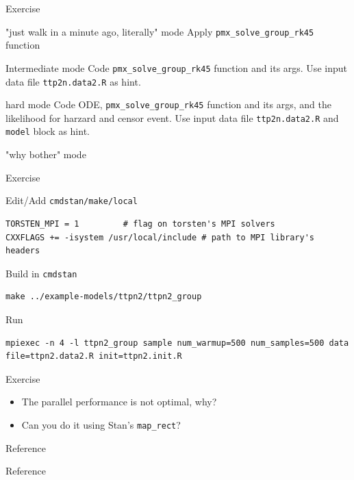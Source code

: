 \documentclass[presentation]{beamer}
\begin{document}
\begin{frame}[fragile,label={sec:org2eb4042}]{Exercise}
 \begin{block}{"just walk in a minute ago, literally" mode}
Apply \texttt{pmx\_solve\_group\_rk45} function
\end{block}
\begin{block}{Intermediate mode}
Code \texttt{pmx\_solve\_group\_rk45} function and its args. Use input data file \texttt{ttp2n.data2.R} as hint.
\end{block}
\begin{block}{hard mode}
Code ODE, \texttt{pmx\_solve\_group\_rk45} function and its args,
and the likelihood for harzard and censor event. Use input
data file \texttt{ttp2n.data2.R} and \texttt{model} block as hint.
\end{block}
\begin{block}{"why bother" mode}
\end{block}
\end{frame}

\begin{frame}[fragile,label={sec:orgaa6afc0}]{Exercise}
 \begin{block}{Edit/Add \texttt{cmdstan/make/local}}
\begin{verbatim}
TORSTEN_MPI = 1         # flag on torsten's MPI solvers
CXXFLAGS += -isystem /usr/local/include # path to MPI library's headers
\end{verbatim}
\end{block}
\begin{block}{Build in \texttt{cmdstan}}
\begin{verbatim}
make ../example-models/ttpn2/ttpn2_group
\end{verbatim}
\end{block}
\begin{block}{Run}
\begin{verbatim}
mpiexec -n 4 -l ttpn2_group sample num_warmup=500 num_samples=500 data file=ttpn2.data2.R init=ttpn2.init.R
\end{verbatim}
\end{block}
\end{frame}

\begin{frame}[fragile,label={sec:org00da842}]{Exercise}
 \begin{itemize}
\item The parallel performance is not optimal, why?
\item Can you do it using Stan's \texttt{map\_rect}?
\end{itemize}
\end{frame}

\begin{frame}[label={sec:org3928b26}]{Reference}


\end{frame}

\begin{frame}[label={sec:org940cb35}]{Reference}


\end{frame}
\end{document}
